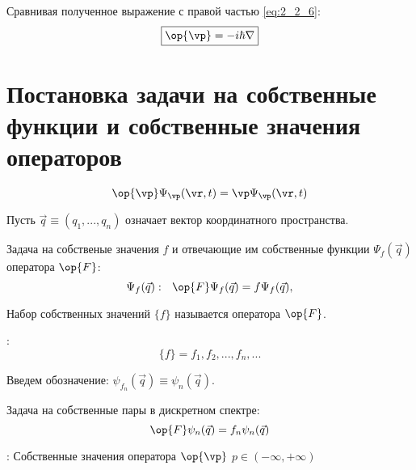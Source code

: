 Сравнивая полученное выражение с правой частью \eqref{eq:2_2_6}:
\begin{equation}
\label{eq:2_2_7}
\boxed{ \op{\vp} = -i\hbar\nabla }
\end{equation}

\section{Постановка задачи на собственные функции и собственные значения операторов}

\begin{equation}
\label{eq:2_3_1}
\op{\vp} \Psi_\vp(\vr,t) = \vp \Psi_\vp(\vr,t)
\end{equation}

Пусть $\vec{q}\equiv(q_1,...,q_n)$ означает вектор координатного пространства.

Задача на собственые значения $f$ и отвечающие им собственные функции $\Psi_f(\vec{q})$ оператора $\op{F}$: 
\begin{equation}
\label{eq:2_3_2}
\Psi_f(\vec{q}):~~ \op{F}\Psi_f(\vec{q}) = f \Psi_f(\vec{q}), 
\end{equation}

\begin{defn}
Набор собственных значений $\{f\}$ называется  оператора $\op{F}$.
\end{defn}

:
$$\{f\} = f_1,f_2,...,f_n,... $$

Введем обозначение: $\psi_{f_n}(\vec{q}) \equiv \psi_n(\vec{q})$.

Задача на собственные пары в дискретном спектре:
\begin{equation}
\label{eq:2_3_3}
\op{F} \psi_n(\vec{q}) = f_n \psi_n(\vec{q})
\end{equation}

: Собственные значения оператора $\op{\vp}$ $p \in (-\infty, +\infty)$
